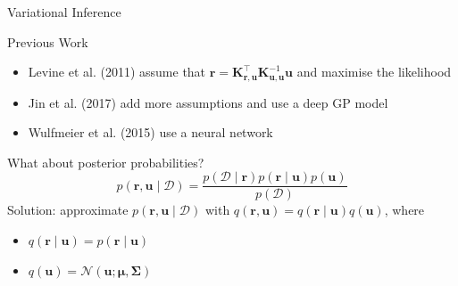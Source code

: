 \documentclass{beamer}
\newcommand{\Kuu}{\mathbf{K}_{\mathbf{u},\mathbf{u}}}
\newcommand{\Kru}{\mathbf{K}_{\mathbf{r},\mathbf{u}}}
\begin{document}

\begin{frame}{Variational Inference}
  \begin{block}{Previous Work}
    \begin{itemize}
    \item Levine et al. (2011) assume that $\mathbf{r} =
      \Kru^\intercal\Kuu^{-1}\mathbf{u}$ and maximise the likelihood
    \item Jin et al. (2017) add more assumptions and use a deep GP model
    \item Wulfmeier et al. (2015) use a neural network
    \end{itemize}
  \end{block}
  What about posterior probabilities?
  \[
    p(\mathbf{r}, \mathbf{u} \mid \mathcal{D}) = \frac{p(\mathcal{D} \mid
      \mathbf{r})p(\mathbf{r} \mid \mathbf{u})p(\mathbf{u})}{p(\mathcal{D})}
  \]
  Solution: approximate $p(\mathbf{r}, \mathbf{u} \mid \mathcal{D})$ with
  $q(\mathbf{r}, \mathbf{u}) = q(\mathbf{r} \mid \mathbf{u})q(\mathbf{u})$, where
  \begin{itemize}
  \item $q(\mathbf{r} \mid \mathbf{u}) = p(\mathbf{r} \mid \mathbf{u})$
  \item $q(\mathbf{u}) = \mathcal{N}(\mathbf{u}; \bm\mu, \bm\Sigma)$
  \end{itemize}
\end{frame}
\end{document}
